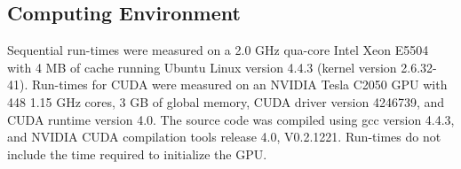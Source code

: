 \subsection{Computing Environment}
Sequential run-times were measured on a 2.0 GHz qua-core Intel Xeon E5504 with
4 MB of cache running Ubuntu Linux version 4.4.3 (kernel version 2.6.32-41).
Run-times for CUDA were measured on an NVIDIA Tesla C2050 GPU with 448 1.15 GHz
cores, 3 GB of global memory, CUDA driver version 4246739, and CUDA runtime
version 4.0. The source code was compiled using gcc version 4.4.3, and NVIDIA
CUDA compilation tools release 4.0, V0.2.1221. Run-times do not include the
time required to initialize the GPU.
